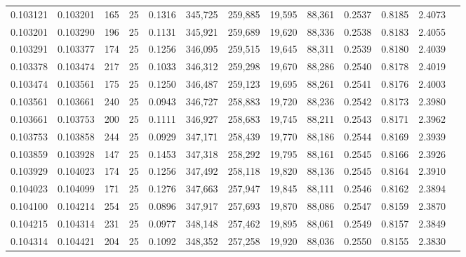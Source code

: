 \begin{tabular}{rrrrrrrrrrrrr}
0.103121 & 0.103201 &   165 &  25 &                                     0.1316 & 345,725 & 259,885 &  19,595 &  88,361 & 0.2537 & 0.8185 & 2.4073 \\
0.103201 & 0.103290 &   196 &  25 &                                     0.1131 & 345,921 & 259,689 &  19,620 &  88,336 & 0.2538 & 0.8183 & 2.4055 \\
0.103291 & 0.103377 &   174 &  25 &                                     0.1256 & 346,095 & 259,515 &  19,645 &  88,311 & 0.2539 & 0.8180 & 2.4039 \\
0.103378 & 0.103474 &   217 &  25 &                                     0.1033 & 346,312 & 259,298 &  19,670 &  88,286 & 0.2540 & 0.8178 & 2.4019 \\
0.103474 & 0.103561 &   175 &  25 &                                     0.1250 & 346,487 & 259,123 &  19,695 &  88,261 & 0.2541 & 0.8176 & 2.4003 \\
0.103561 & 0.103661 &   240 &  25 &                                     0.0943 & 346,727 & 258,883 &  19,720 &  88,236 & 0.2542 & 0.8173 & 2.3980 \\
0.103661 & 0.103753 &   200 &  25 &                                     0.1111 & 346,927 & 258,683 &  19,745 &  88,211 & 0.2543 & 0.8171 & 2.3962 \\
0.103753 & 0.103858 &   244 &  25 &                                     0.0929 & 347,171 & 258,439 &  19,770 &  88,186 & 0.2544 & 0.8169 & 2.3939 \\
0.103859 & 0.103928 &   147 &  25 &                                     0.1453 & 347,318 & 258,292 &  19,795 &  88,161 & 0.2545 & 0.8166 & 2.3926 \\
0.103929 & 0.104023 &   174 &  25 &                                     0.1256 & 347,492 & 258,118 &  19,820 &  88,136 & 0.2545 & 0.8164 & 2.3910 \\
0.104023 & 0.104099 &   171 &  25 &                                     0.1276 & 347,663 & 257,947 &  19,845 &  88,111 & 0.2546 & 0.8162 & 2.3894 \\
0.104100 & 0.104214 &   254 &  25 &                                     0.0896 & 347,917 & 257,693 &  19,870 &  88,086 & 0.2547 & 0.8159 & 2.3870 \\
0.104215 & 0.104314 &   231 &  25 &                                     0.0977 & 348,148 & 257,462 &  19,895 &  88,061 & 0.2549 & 0.8157 & 2.3849 \\
0.104314 & 0.104421 &   204 &  25 &                                     0.1092 & 348,352 & 257,258 &  19,920 &  88,036 & 0.2550 & 0.8155 & 2.3830 \\

\end{tabular}
